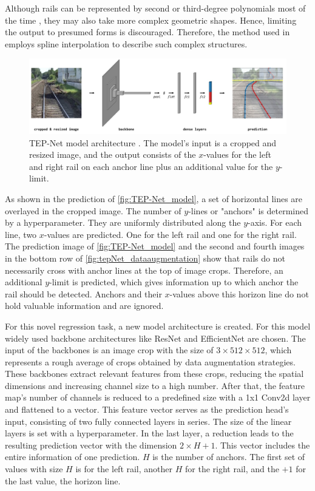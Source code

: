 Although rails can be represented by second or third-degree polynomials most of the time \cite{PolyLaneNetRoad2021}, they may also take more complex geometric shapes.
Hence, limiting the output to presumed forms is discouraged.
Therefore, the method used in \cite{tepNet2024} employs spline interpolation to describe such complex structures.

\begin{figure}[H]
    \centering
    \includegraphics[width=\linewidth]{PICs/Baselinepaper/TEP-Net_model.jpg}
    \caption{\ac{TEP}-Net model architecture \cite{tepNet2024}. The model's input is a cropped and resized image, and the output consists of the $x$-values for the left and right rail on each anchor line plus an additional value for the $y$-limit.}
    \label{fig:TEP-Net_model}
\end{figure}

\noindent As shown in the prediction of \autoref{fig:TEP-Net_model}, a set of horizontal lines are overlayed in the cropped image.
The number of $y$-lines or "anchors" is determined by a hyperparameter.
They are uniformly distributed along the $y$-axis. For each line, two $x$-values are predicted.
One for the left rail and one for the right rail.
The prediction image of \autoref{fig:TEP-Net_model} and the second and fourth images in the bottom row of \autoref{fig:tepNet_dataaugmentation} show that rails do not necessarily cross with anchor lines at the top of image crops.
Therefore, an additional $y$-limit is predicted, which gives information up to which anchor the rail should be detected.
Anchors and their $x$-values above this horizon line do not hold valuable information and are ignored.

For this novel regression task, a new model architecture is created.
For this model widely used backbone architectures like ResNet and EfficientNet are chosen.
The input of the backbones is an image crop with the size of $3 \times 512 \times 512$, which represents a rough average of crops obtained by data augmentation strategies.
These backbones extract relevant features from these crops, reducing the spatial dimensions and increasing channel size to a high number.
After that, the feature map's number of channels is reduced to a predefined size with a 1x1 Conv2d layer \cite{pytorch_conv2d_docu} and flattened to a vector.
This feature vector serves as the prediction head's input, consisting of two fully connected layers \cite{pytorch_linearLayer_docu} in series.
The size of the linear layers is set with a hyperparameter.
In the last layer, a reduction leads to the resulting prediction vector with the dimension $2 \times H + 1$.
This vector includes the entire information of one prediction.
$H$ is the number of anchors.
The first set of values with size $H$ is for the left rail, another $H$ for the right rail, and the $+ 1$ for the last value, the horizon line.

